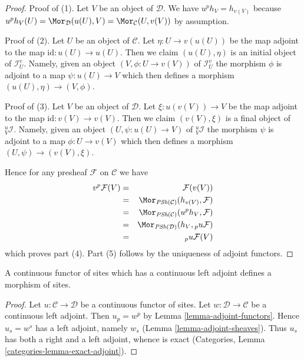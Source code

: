 \begin{proof}
Proof of (1). Let $V$ be an object of $\mathcal{D}$. We have
$u^ph_V = h_{v(V)}$ because
$u^ph_V(U) = \Mor_\mathcal{D}(u(U), V) = \Mor_\mathcal{C}(U, v(V))$
by assumption.

\medskip\noindent
Proof of (2). Let $U$ be an object of $\mathcal{C}$. Let
$\eta : U \to v(u(U))$ be the map adjoint to the map
$\text{id} : u(U) \to u(U)$. Then we claim $(u(U), \eta)$
is an initial object of $\mathcal{I}_U^v$. Namely, given
an object $(V, \phi : U \to v(V))$ of $\mathcal{I}_U^v$
the morphism $\phi$ is adjoint to a map $\psi : u(U) \to V$
which then defines a morphism $(u(U), \eta) \to (V, \phi)$.

\medskip\noindent
Proof of (3). Let $V$ be an object of $\mathcal{D}$. Let
$\xi : u(v(V)) \to V$ be the map adjoint to the map
$\text{id} : v(V) \to v(V)$. Then we claim $(v(V), \xi)$
is a final object of ${}_V^u\mathcal{I}$. Namely, given
an object $(U, \psi : u(U) \to V)$ of ${}_V^u\mathcal{I}$
the morphism $\psi$ is adjoint to a map $\phi : U \to v(V)$
which then defines a morphism $(U, \psi) \to (v(V), \xi)$.

\medskip\noindent
Hence for any presheaf $\mathcal{F}$ on $\mathcal{C}$ we have
\begin{eqnarray*}
v^p\mathcal{F}(V)
& = &
\mathcal{F}(v(V)) \\
& = &
\Mor_{\textit{PSh}(\mathcal{C})}(h_{v(V)}, \mathcal{F}) \\
& = &
\Mor_{\textit{PSh}(\mathcal{C})}(u^ph_V, \mathcal{F}) \\
& = &
\Mor_{\textit{PSh}(\mathcal{D})}(h_V, {}_pu\mathcal{F}) \\
& = &
{}_pu\mathcal{F}(V)
\end{eqnarray*}
which proves part (4). Part (5) follows by the uniqueness of adjoint functors.
\end{proof}

\begin{lemma}
\label{lemma-continuous-with-continuous-left-adjoint}
A continuous functor of sites which has a continuous left adjoint
defines a morphism of sites.
\end{lemma}

\begin{proof}
Let $u : \mathcal{C} \to \mathcal{D}$ be a continuous functor of sites.
Let $w : \mathcal{D} \to \mathcal{C}$ be a continuous left adjoint.
Then $u_p = w^p$ by Lemma \ref{lemma-adjoint-functors}.
Hence $u_s = w^s$ has a left adjoint, namely $w_s$
(Lemma \ref{lemma-adjoint-sheaves}). Thus $u_s$ has both a right and a
left adjoint, whence is exact
(Categories, Lemma \ref{categories-lemma-exact-adjoint}).
\end{proof}




